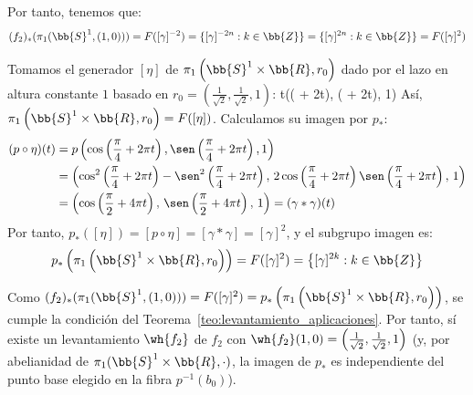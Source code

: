 \begin{ejemplo}
\begin{description}
\begin{description}
            Por tanto, tenemos que:
            \begin{gather*}
                (f_2)_*(\pi_1(\bb{S}^1,(1,0))) = F([\gamma]^{-2}) = \{[\gamma]^{-2n} : k\in \bb{Z}\} = \{[\gamma]^{2n} : k\in \bb{Z}\}
                = F([\gamma]^{2})
            \end{gather*}

            \item[Cálculo de $p_*\left(\pi_1\left(\bb{S}^1\times \bb{R},r_0\right)\right)$:] Tomamos el generador $[\eta]$ de $\pi_1\left(\bb{S}^1\times \bb{R},r_0\right)$ dado por el lazo en altura constante $1$ basado en $r_0=\left(\frac{1}{\sqrt{2}}, \frac{1}{\sqrt{2}}, 1\right)$:
                    {t}{\left(\cos\left( + 2\pi t\right), \sen\left( + 2\pi t\right), 1\right)}
                Así, $\pi_1\left(\bb{S}^1\times \bb{R},r_0\right) = F([\eta])$. Calculamos su imagen por $p_*$:
                \begin{align*}
                    (p\circ \eta)(t) &= p\left(\cos\left(\frac{\pi}{4} + 2\pi t\right), \sen\left(\frac{\pi}{4} + 2\pi t\right), 1\right) \\
                    &= \left(\cos^2\left(\frac{\pi}{4} + 2\pi t\right) - \sen^2\left(\frac{\pi}{4} + 2\pi t\right),\, 2\cos\left(\frac{\pi}{4} + 2\pi t\right)\sen\left(\frac{\pi}{4} + 2\pi t\right),\, 1\right) \\
                    &= \left(\cos\left(\frac{\pi}{2} + 4\pi t\right),\, \sen\left(\frac{\pi}{2} + 4\pi t\right),\, 1\right) = (\gamma \ast \gamma)(t)
                \end{align*}
                Por tanto, $p_*([\eta]) = [p\circ \eta] = [\gamma \ast \gamma] = [\gamma]^2$, y el subgrupo imagen es:
                \begin{equation*}
                    p_*\left(\pi_1\left(\bb{S}^1\times \bb{R},r_0\right)\right) = F([\gamma]^2) = \left\{[\gamma]^{2k} : k\in \bb{Z}\right\}
                \end{equation*}
        \end{description}

        Como $(f_2)_*(\pi_1(\bb{S}^1,(1,0))) = F([\gamma]^2) = p_*\left(\pi_1\left(\bb{S}^1\times \bb{R},r_0\right)\right)$, se cumple la condición del Teorema~\ref{teo:levantamiento_aplicaciones}. Por tanto, sí existe un levantamiento $\wh{f_2}$ de $f_2$ con $\wh{f_2}(1,0) = \left(\frac{1}{\sqrt{2}}, \frac{1}{\sqrt{2}}, 1\right)$ (y, por abelianidad de $\pi_1(\bb{S}^1\times \bb{R}, \cdot)$, la imagen de $p_*$ es independiente del punto base elegido en la fibra $p^{-1}(b_0)$).
    \end{description}
\end{ejemplo}

